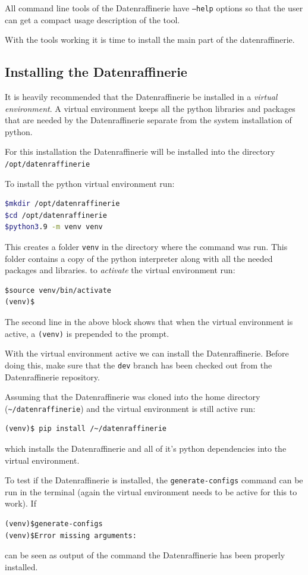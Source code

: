 \documentclass[11pt]{article}
\begin{document}
All command line tools of the Datenraffinerie have \texttt{--help} options so that the user can get a compact usage description of the tool.

With the tools working it is time to install the main part of the datenraffinerie.

\subsection{Installing the Datenraffinerie}
It is heavily recommended that the Datenraffinerie be installed in a \emph{virtual environment}. A virtual environment keeps all the python libraries and packages that are needed by the Datenraffinerie separate from the system installation of python.

For this installation the Datenraffinerie will be installed into the directory \verb|/opt/datenraffinerie|
	
To install the python virtual environment run:
\begin{lstlisting}[language=bash]
$mkdir /opt/datenraffinerie
$cd /opt/datenraffinerie
$python3.9 -m venv venv
\end{lstlisting}
This creates a folder \texttt{venv} in the directory where the command was run. This folder contains a copy of the python interpreter along with all the needed packages and libraries.
to \emph{activate} the virtual environment run:
\begin{lstlisting}
$source venv/bin/activate
(venv)$
\end{lstlisting}
The second line in the above block shows that when the virtual environment is active, a \texttt{(venv)} is prepended to the prompt.

With the virtual environment active we can install the Datenraffinerie.
Before doing this, make sure that the \texttt{dev} branch has been checked out from the Datenraffinerie repository.

Assuming that the Datenraffinerie was cloned into the home directory (\verb|~/datenraffinerie|) and the virtual environment is still active run:
\begin{lstlisting}
(venv)$ pip install /~/datenraffinerie
\end{lstlisting}
which installs the Datenraffinerie and all of it's python dependencies into the virtual environment.
 
To test if the Datenraffinerie is installed, the \texttt{generate-configs} command can be run in the terminal (again the virtual environment needs to be active for this to work). If
\begin{lstlisting}
(venv)$generate-configs
(venv)$Error missing arguments:  
\end{lstlisting}
can be seen as output of the command the Datenraffinerie has been properly installed.
\end{document}
